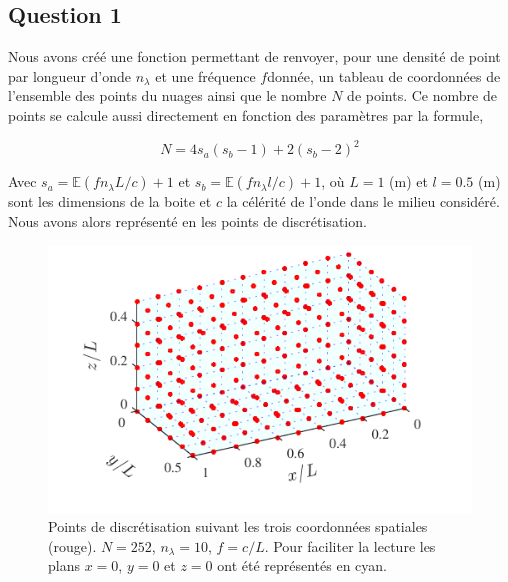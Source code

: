 \documentclass[10pt]{article}
\begin{document}
\begin{multicols}{2}



\section*{Question 1}

Nous avons créé une fonction permettant de renvoyer, pour une densité de point par longueur d'onde $n_\lambda$ et une fréquence $f$donnée, un tableau de coordonnées de l'ensemble des points du nuages ainsi que le nombre $N$ de points. Ce nombre de points se calcule aussi directement en fonction des paramètres par la formule, 

\begin{equation}
N = 4s_a(s_b-1) + 2(s_b-2)^{2}
\label{eq:N}
\end{equation}

Avec $s_a = \mathbb{E}(f n_\lambda L/c)+1$ et $s_b = \mathbb{E}(f n_\lambda l/c)+1$, où $L=1$ (m) et $l=0.5$ (m) sont les dimensions de la boite et $c$ la célérité de l'onde dans le milieu considéré. Nous avons alors représenté en  les points de discrétisation.


\begin{figure}[H]
  \begin{center}
  \includegraphics[width=0.95\columnwidth]{Q1_4.pdf}
  \vspace*{-11pt}
  \caption{Points de discrétisation suivant les trois coordonnées spatiales (rouge). $N=252$, $n_\lambda = 10$, $f = c/L$. Pour faciliter la lecture les plans $x=0$, $y=0$ et $z=0$ ont été représentés en cyan.}
  \label{fig:Q1}
  \end{center}
\end{figure}
\vspace*{-22pt}



\end{multicols}
\end{document}
